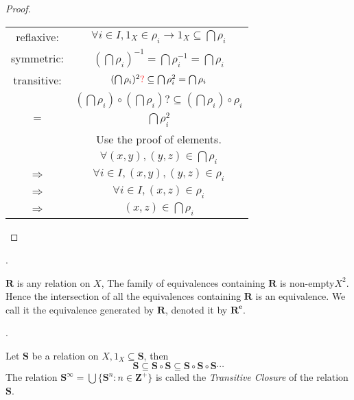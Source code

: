 \begin{Rmk}
\begin{proof}
        \begin{center}
            \begin{tabular}{c c}
                reflaxive: & $\forall i \in I, 1_X\in \rho_i \rightarrow 1_X \subseteq \bigcap \rho_i$  \\
                symmetric: & $(\bigcap \rho_i)^{-1} = \bigcap \rho_i^{-1} = \bigcap \rho_i$ \\
                transitive: & $(\bigcap \rho_i)^2\text{\textcolor{red}{?}}\subseteq \bigcap \rho_i^2 = \bigcap \rho_i$  \\
                & $(\bigcap \rho_i)\circ (\bigcap \rho_i) ?\subseteq (\bigcap \rho_i)\circ \rho_i$   \\
                $=$ & $\bigcap \rho_i^2$    \\
                & Use the proof of elements.    \\
                & $\forall (x,y),(y,z) \in \bigcap \rho_i$  \\
                $\Rightarrow $ & $\forall i \in I, (x,y),(y,z)\in \rho_i$   \\
                $\Rightarrow $ & $\forall i \in I, (x,z) \in \rho_i$ \\
                $\Rightarrow $ & $(x,z) \in \bigcap \rho_i$
            \end{tabular}
        \end{center}

    \end{proof}
\end{Rmk}

\begin{Def}[$\mathbf{R^e}$].

    $\mathbf{R}$ is any relation on $X$, The family of equivalences containing $\mathbf{R}$ is non-empty$X^2$. Hence the intersection of all the equivalences containing $\mathbf{R}$ is an equivalence. We call it the equivalence generated by $\mathbf{R}$, denoted it by $\mathbf{R^e}$.
\end{Def}

\begin{Def}.

    Let $\mathbf{S}$ be a relation on $X, 1_X \subseteq \mathbf{S}$, then
    \[
        \mathbf{S}\subseteq \mathbf{S}\circ \mathbf{S}\subseteq \mathbf{S}\circ \mathbf{S}\circ \mathbf{S}\cdots 
    \]
    The relation $\mathbf{S}^{\infty}=\bigcup\{\mathbf{S}^n: n\in \mathbf{Z}^+\}$ is called the \emph{Transitive Closure} of the relation $\mathbf{S}$.
\end{Def}

